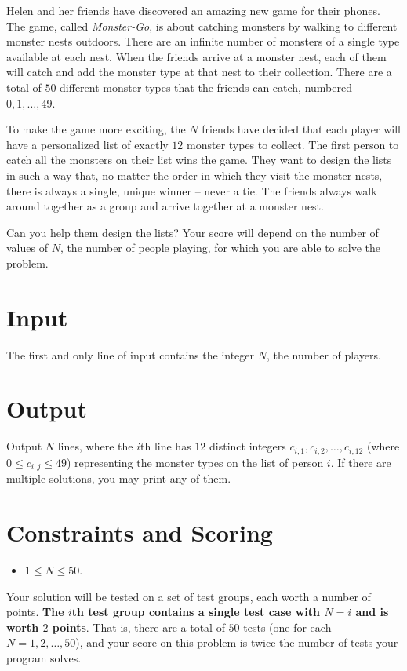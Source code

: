 
Helen and her friends have discovered an amazing new game for their phones.
The game, called \textit{Monster-Go}, is about catching monsters by walking to different monster nests outdoors.
There are an infinite number of monsters of a single type available at each nest.
When the friends arrive at a monster nest, each of them will catch and add the monster type at that nest to their collection.
There are a total of $50$ different monster types that the friends can catch, numbered $0,1,\ldots,49$.

To make the game more exciting, the $N$ friends have decided that each player will have a personalized list of exactly $12$ monster types to collect.
The first person to catch all the monsters on their list wins the game.
They want to design the lists in such a way that, no matter the order in which they visit the monster nests, there is always a single, unique winner -- never a tie.
The friends always walk around together as a group and arrive together at a monster nest.

Can you help them design the lists?
Your score will depend on the number of values of $N$, the number of people playing, for which you are able to solve the problem.

\section*{Input}
The first and only line of input contains the integer $N$, the number of players.

\section*{Output}
Output $N$ lines, where the $i$th line has $12$ distinct integers $c_{i,1}, c_{i,2}, \ldots, c_{i,12}$ (where $0 \le c_{i,j} \le 49$) representing the monster types on the list of person $i$.
If there are multiple solutions, you may print any of them.

\section*{Constraints and Scoring}
\begin{itemize}
  \item $1 \leq N \leq 50$.
\end{itemize}

\noindent
Your solution will be tested on a set of test groups, each worth a number of points.
\textbf{The $i$th test group contains a single test case with $N = i$ and is worth $2$ points}. That is, there are a total of $50$ tests (one for each $N = 1, 2, \ldots, 50$), and your score on this problem is twice the number of tests your program solves.

